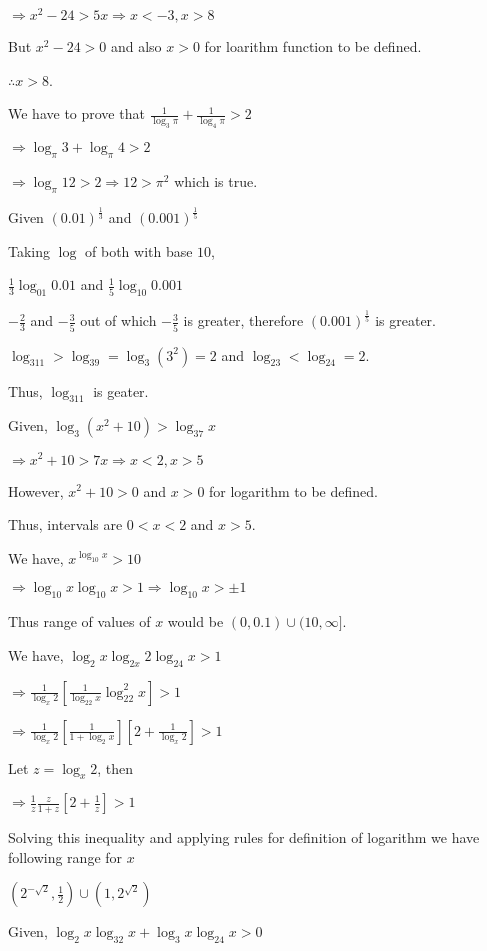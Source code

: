   $\Rightarrow x^2 - 24 > 5x \Rightarrow x < -3, x > 8$

  But $x^2 - 24 > 0$ and also $x > 0$ for loarithm function to be defined.

  $\therefore x > 8$.
\item We have to prove that $\frac{1}{\log_3\pi} + \frac{1}{\log_4\pi} > 2$

  $\Rightarrow \log_{\pi}3 + \log_{\pi}4 > 2$

  $\Rightarrow \log_{\pi}12 > 2 \Rightarrow 12 > \pi^2$ which is true.
\item Given $(0.01)^{\tfrac{1}{3}}$ and $(0.001)^{\tfrac{1}{5}}$

  Taking $\log$ of both with base $10$,

  $\frac{1}{3}\log_{01}0.01$ and $\frac{1}{5}\log_{10}0.001$

  $-\frac{2}{3}$ and $-\frac{3}{5}$ out of which $-\frac{3}{5}$ is greater, therefore $(0.001)^{\tfrac{1}{5}}$ is greater.
\item $\log_311 > \log_39 = \log_3(3^2) = 2$ and $\log_23 < \log_24 = 2$.

  Thus, $\log_311$ is geater.
\item Given, $\log_3(x^2 + 10) > \log_37x$

  $\Rightarrow x^2 + 10 > 7x \Rightarrow x < 2, x > 5$

  However, $x^2 + 10 > 0$ and $x > 0$ for logarithm to be defined.

  Thus, intervals are $0 < x < 2$ and $x > 5$.
\item We have, $x^{\log_{10}x} > 10$

  $\Rightarrow \log_{10}x\log_{10}x > 1 \Rightarrow \log_{10}x > \pm 1$

  Thus range of values of $x$ would be $(0, 0.1)\cup(10, \infty]$.
\item We have, $\log_2x\log_{2x}2\log_24x > 1$

  $\Rightarrow \frac{1}{\log_x2}\left[\frac{1}{\log_22x}\log_22^2x\right] > 1$

  $\Rightarrow \frac{1}{\log_x2}\left[\frac{1}{1 + \log_2x}\right]\left[2 + \frac{1}{\log_x2}\right] > 1$

  Let $z = \log_x2$, then

  $\Rightarrow \frac{1}{z}\frac{z}{1 + z}\left[2 + \frac{1}{z}\right] > 1$

  Solving this inequality and applying rules for definition of logarithm we have following range for $x$

  $\left(2^{-\sqrt{2}}, \frac{1}{2}\right)\cup\left(1, 2^{\sqrt{2}}\right)$
\item Given, $\log_2x\log_32x + \log_3x\log_24x > 0$

